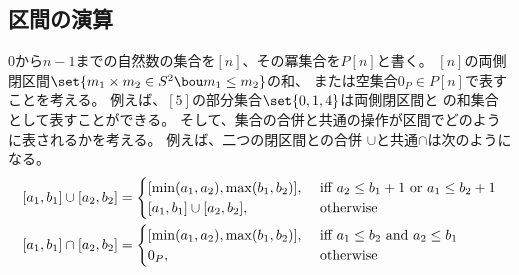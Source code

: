 \subsection{区間の演算}\label{s2:区間の演算} %
	$0$から$n-1$までの自然数の集合を$[n]$、その冪集合を$P[n]$と書く。
	$[n]$の両側閉区間$\set{m_1\times m_2\in S^2\bou m_1\le m_2}$の和、
	または空集合$0_P\in P[n]$で表すことを考える。
	例えば、$[5]$の部分集合$\set{0,1,4}$は両側閉区間と
	の和集合として表すことができる。
	そして、集合の合併と共通の操作が区間でどのように表されるかを考える。
	例えば、二つの閉区間との合併
	$\cup$と共通$\cap$は次のようになる。
	\begin{equation*}\begin{split} %
		\closeclose{a_1}{b_1} \cup \closeclose{a_2}{b_2} &= \begin{cases}
			\closeclose{\min(a_1,a_2)}{\max(b_1,b_2)}
				, &\text{ iff } a_2 \le b_1 + 1 \text{ or } a_1 \le b_2 + 1 \\
			\closeclose{a_1}{b_1} \cup \closeclose{a_2}{b_2}
				, &\text{ otherwise } \\
		\end{cases} \\
		\closeclose{a_1}{b_1} \cap \closeclose{a_2}{b_2} &= \begin{cases}
			\closeclose{\min(a_1,a_2)}{\max(b_1,b_2)}
				, &\text{ iff } a_1 \le b_2 \text{ and } a_2 \le b_1 \\
			0_P, &\text{ otherwise } \\
		\end{cases} \\
	\end{split}\end{equation*} %

